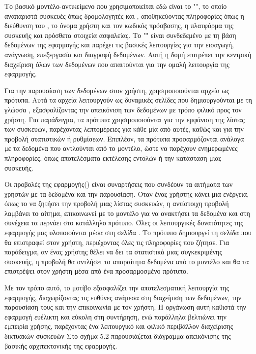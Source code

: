 Το βασικό μοντέλο-αντικείμενο που χρησιμοποιείται εδώ είναι το "", 
το οποίο αναπαριστά συσκευές όπως δρομολογητές και , 
αποθηκεύοντας πληροφορίες όπως η διεύθυνση του , το όνομα 
χρήστη και τον κωδικός πρόσβασης, η πλατφόρμα της συσκευής 
και πρόσθετα στοιχεία ασφαλείας. Το "" είναι συνδεδεμένο με 
τη βάση δεδομένων της εφαρμογής και παρέχει τις βασικές λειτουργίες 
για την εισαγωγή, ανάγνωση, επεξεργασία και διαγραφή δεδομένων. 
Αυτή η δομή επιτρέπει την κεντρική διαχείριση όλων των δεδομένων που 
απαιτούνται για την ομαλή λειτουργία της εφαρμογής.

Για την παρουσίαση των δεδομένων στον χρήστη, χρησιμοποιούνται αρχεία 
 ως πρότυπα. Αυτά τα αρχεία λειτουργούν ως δυναμικές σελίδες 
που δημιουργούνται με τη γλώσσα , εξασφαλίζοντας 
την απεικόνιση των δεδομένων με τρόπο φιλικό προς τον χρήστη. 
Για παράδειγμα, τα πρότυπα χρησιμοποιούνται για την εμφάνιση της λίστας των συσκευών, παρέχοντας λεπτομέρειες για κάθε μία από αυτές, καθώς και για την προβολή στατιστικών ή ρυθμίσεων. Επιπλέον, τα πρότυπα προσαρμόζονται ανάλογα με τα δεδομένα που αντλούνται από το μοντέλο, ώστε να παρέχουν ενημερωμένες πληροφορίες, όπως αποτελέσματα εκτέλεσης εντολών ή την κατάσταση μιας συσκευής.

Οι προβολές της εφαρμογής() είναι συναρτήσεις  που συνδέουν 
τα αιτήματα των χρηστών με τα δεδομένα και την παρουσίαση. 
Όταν ένας χρήστης κάνει μια ενέργεια, όπως το να ζητήσει την προβολή 
μιας λίστας συσκευών, η αντίστοιχη προβολή λαμβάνει το αίτημα, 
επικοινωνεί με το μοντέλο για να ανακτήσει τα δεδομένα και στη 
συνέχεια τα περνάει στο κατάλληλο πρότυπο. Όλες οι λειτουργικές δυνατότητες της εφαρμογής μας υλοποιούνται μέσα στη σελίδα .
Το πρότυπο δημιουργεί τη σελίδα  που θα επιστραφεί στον χρήστη, περιέχοντας όλες τις πληροφορίες που ζήτησε. Για παράδειγμα, αν ένας χρήστης θέλει να δει τα στατιστικά μιας συγκεκριμένης συσκευής, η προβολή θα αντλήσει τα απαραίτητα δεδομένα από το μοντέλο και θα τα επιστρέψει στον χρήστη μέσα από ένα προσαρμοσμένο πρότυπο.

Με τον τρόπο αυτό, το μοτίβο  εξασφαλίζει την αποτελεσματική 
λειτουργία της εφαρμογής, διαχωρίζοντας τις ευθύνες ανάμεσα στη 
διαχείριση των δεδομένων, την παρουσίαση τους και την επικοινωνία με τον χρήστη. Η οργάνωση αυτή καθιστά την εφαρμογή ευέλικτη και εύκολη στη συντήρηση, ενώ παράλληλα βελτιώνει την εμπειρία χρήσης, παρέχοντας ένα λειτουργικό και φιλικό περιβάλλον διαχείρισης δικτυακών συσκευών
Στο σχήμα 5.2 παρουσιάζεται διάγραμμα απεικόνισης της βασικής αρχιτεκτονικής της εφαρμογής.

